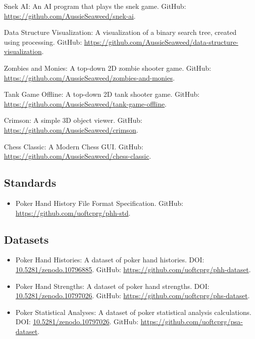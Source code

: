 \documentclass{article}
\begin{document}
\begin{itemize}
{			\item Snek AI: An AI program that plays the snek game. {\small GitHub: \url{https://github.com/AussieSeaweed/snek-ai}.}
			\item Data Structure Visualization: A visualization of a binary search tree, created using processing. {\small GitHub: \url{https://github.com/AussieSeaweed/data-structure-visualization}.}
			\item Zombies and Monies: A top-down 2D zombie shooter game. {\small GitHub: \url{https://github.com/AussieSeaweed/zombies-and-monies}.}
			\item Tank Game Offline: A top-down 2D tank shooter game. {\small GitHub: \url{https://github.com/AussieSeaweed/tank-game-offline}.}
			\item Crimson: A simple 3D object viewer. {\small GitHub: \url{https://github.com/AussieSeaweed/crimson}.}
			\item Chess Classic: A Modern Chess GUI. {\small GitHub: \url{https://github.com/AussieSeaweed/chess-classic}.}
		}{}
	\end{itemize}

	\subsection*{Standards}

	\begin{itemize}
		\item Poker Hand History File Format Specification. {\small GitHub: \url{https://github.com/uoftcprg/phh-std}.}
	\end{itemize}

	\subsection*{Datasets}

	\begin{itemize}
		\item Poker Hand Histories: A dataset of poker hand histories. {\small DOI: \href{https://doi.org/10.5281/zenodo.10796885}{10.5281/zenodo.10796885}. GitHub: \url{https://github.com/uoftcprg/phh-dataset}.}
		\item Poker Hand Strengths: A dataset of poker hand strengths. {\small DOI: \href{https://doi.org/10.5281/zenodo.10797026}{10.5281/zenodo.10797026}. GitHub: \url{https://github.com/uoftcprg/phs-dataset}.}
  		\item Poker Statistical Analyses: A dataset of poker statistical analysis calculations. {\small DOI: \href{https://doi.org/10.5281/zenodo.10797026}{10.5281/zenodo.10797026}. GitHub: \url{https://github.com/uoftcprg/psa-dataset}.}
	\end{itemize}
\end{document}
